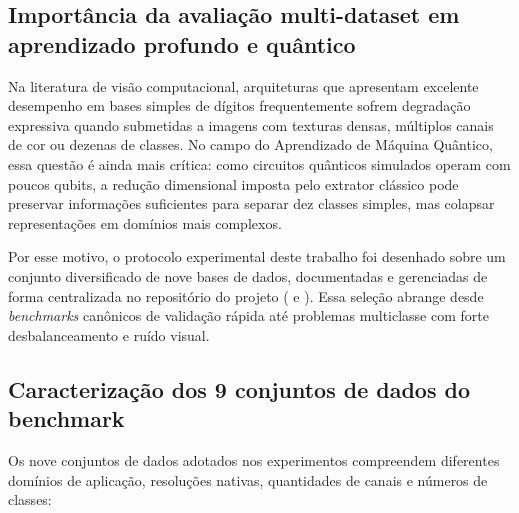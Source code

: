 \documentclass[
    12pt,
    openright,
    oneside,
    a4paper,
    english,
    brazil
]{abntex2}
\begin{document}
\subsection{Importância da avaliação multi-dataset em aprendizado profundo e quântico}

Na literatura de visão computacional, arquiteturas que apresentam excelente desempenho em bases simples de dígitos frequentemente sofrem degradação expressiva quando submetidas a imagens com texturas densas, múltiplos canais de cor ou dezenas de classes. No campo do Aprendizado de Máquina Quântico, essa questão é ainda mais crítica: como circuitos quânticos simulados operam com poucos qubits, a redução dimensional imposta pelo extrator clássico pode preservar informações suficientes para separar dez classes simples, mas colapsar representações em domínios mais complexos.

Por esse motivo, o protocolo experimental deste trabalho foi desenhado sobre um conjunto diversificado de nove bases de dados, documentadas e gerenciadas de forma centralizada no repositório do projeto ( e ). Essa seleção abrange desde \textit{benchmarks} canônicos de validação rápida até problemas multiclasse com forte desbalanceamento e ruído visual.

\subsection{Caracterização dos 9 conjuntos de dados do benchmark}

Os nove conjuntos de dados adotados nos experimentos compreendem diferentes domínios de aplicação, resoluções nativas, quantidades de canais e números de classes:
\end{document}
